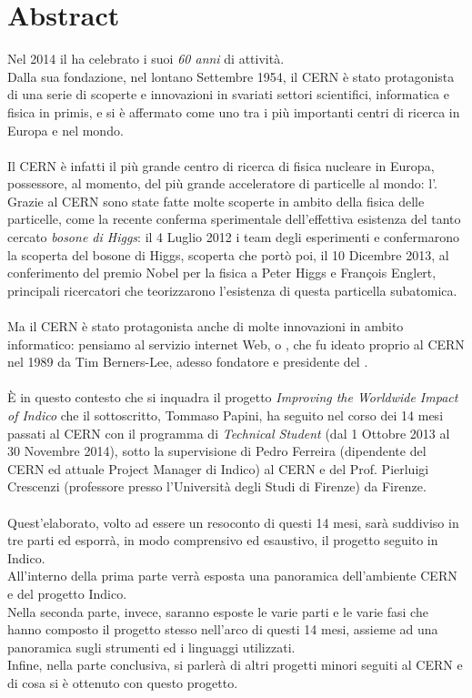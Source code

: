 \cleardoublepage
{}
\chapter*{Abstract}

	Nel 2014 il  ha celebrato i suoi \textit{60 anni} di attività.\\
	Dalla sua fondazione, nel lontano Settembre 1954, il \ac{CERN} è stato protagonista di una serie di scoperte e innovazioni in svariati settori scientifici, informatica e fisica in primis, e si è affermato come uno tra i più importanti centri di ricerca in Europa e nel mondo.\\
	\\
	Il \ac{CERN} è infatti il più grande centro di ricerca di fisica nucleare in Europa, possessore, al momento, del più grande acceleratore di particelle al mondo: l'.\\
	Grazie al \ac{CERN} sono state fatte molte scoperte in ambito della fisica delle particelle, come la recente conferma sperimentale dell'effettiva esistenza del tanto cercato \textit{bosone di Higgs}: il 4 Luglio 2012 i team degli esperimenti  e  confermarono la scoperta del bosone di Higgs, scoperta che portò poi, il 10 Dicembre 2013, al conferimento del premio Nobel per la fisica a Peter Higgs e François Englert, principali ricercatori che teorizzarono l'esistenza di questa particella subatomica.\\
	\\
	Ma il \ac{CERN} è stato protagonista anche di molte innovazioni in ambito informatico: pensiamo al servizio internet Web, o , che fu ideato proprio al \ac{CERN} nel 1989 da Tim Berners-Lee, adesso fondatore e presidente del .\\
	\\
	È in questo contesto che si inquadra il progetto \textit{Improving the Worldwide Impact of Indico} che il sottoscritto, Tommaso Papini, ha seguito nel corso dei 14 mesi passati al \ac{CERN} con il programma di \textit{Technical Student} (dal 1 Ottobre 2013 al 30 Novembre 2014), sotto la supervisione di Pedro Ferreira (dipendente del \ac{CERN} ed attuale Project Manager di Indico) al \ac{CERN} e del Prof. Pierluigi Crescenzi (professore presso l'Università degli Studi di Firenze) da Firenze.\\
	\\
	Quest'elaborato, volto ad essere un resoconto di questi 14 mesi, sarà suddiviso in tre parti ed esporrà, in modo comprensivo ed esaustivo, il progetto seguito in Indico.\\
	All'interno della prima parte verrà esposta una panoramica dell'ambiente \ac{CERN} e del progetto Indico.\\
	Nella seconda parte, invece, saranno esposte le varie parti e le varie fasi che hanno composto il progetto stesso nell'arco di questi 14 mesi, assieme ad una panoramica sugli strumenti ed i linguaggi utilizzati.\\
	Infine, nella parte conclusiva, si parlerà di altri progetti minori seguiti al \ac{CERN} e di cosa si è ottenuto con questo progetto.
	